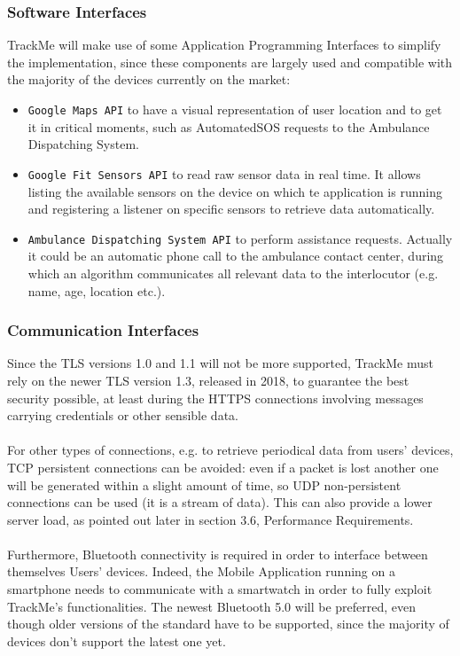 \documentclass[12pt,a4paper]{article}
\begin{document}
	\subsubsection{Software Interfaces}
		TrackMe will make use of some Application Programming Interfaces to simplify the implementation, since these components are largely used and compatible with the majority of the devices currently on the market:
		\begin{itemize}
			\item \texttt{Google Maps API} to have a visual representation of user location and to get it in critical moments, such as AutomatedSOS requests to the Ambulance Dispatching System.
			\item \texttt{Google Fit Sensors API} to read raw sensor data in real time. It allows listing the available sensors on the device on which te application is running and registering a listener on specific sensors to retrieve data automatically.
			\item \texttt{Ambulance Dispatching System API} to perform assistance requests. Actually it could be an automatic phone call to the ambulance contact center, during which an algorithm communicates all relevant data to the interlocutor (e.g. name, age, location etc.).
		\end{itemize}
	\subsubsection{Communication Interfaces}
			Since the TLS versions 1.0 and 1.1 will not be more supported, TrackMe must rely on the newer TLS version 1.3, released in 2018, to guarantee the best security possible, at least during the HTTPS connections involving messages carrying credentials or other sensible data.
			\\ \\
			For other types of connections, e.g. to retrieve periodical data from users' devices, TCP persistent connections can be avoided: even if a packet is lost another one will be generated within a slight amount of time, so UDP non-persistent connections can be used (it is a stream of data). This can also provide a lower server load, as pointed out later in section 3.6, Performance Requirements.
			\\ \\
			Furthermore, Bluetooth connectivity is required in order to interface between themselves Users' devices. Indeed, the Mobile Application running on a smartphone needs to communicate with a smartwatch in order to fully exploit TrackMe's functionalities. The newest Bluetooth 5.0 will be preferred, even though older versions of the standard have to be supported, since the majority of devices don't support the latest one yet.
\end{document}
